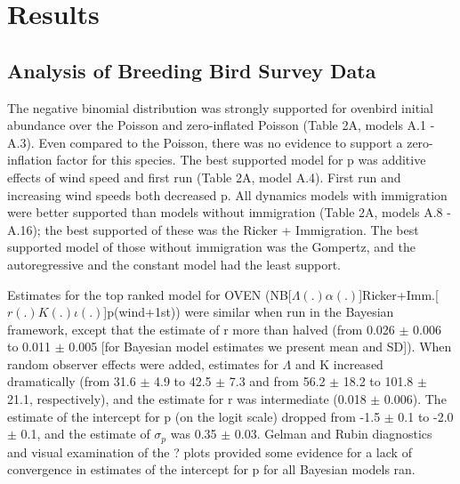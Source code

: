 \documentclass[12pt]{article}
\begin{document}
\section{Results}

\subsection{Analysis of Breeding Bird Survey Data}


The negative binomial distribution was strongly supported for ovenbird
initial abundance over the Poisson and zero-inflated Poisson (Table
2A, models A.1 - A.3).  Even compared to the Poisson, there was no
evidence to support a zero-inflation factor for this species.  The
best supported model for p was additive effects of wind speed and
first run (Table 2A, model A.4).  First run and increasing wind speeds
both decreased p.  All dynamics models with immigration were better
supported than models without immigration (Table 2A, models A.8 -
A.16); the best supported of these was the Ricker + Immigration.  The
best supported model of those without immigration was the Gompertz,
and the autoregressive and the constant model had the least support.

Estimates for the top ranked model for OVEN
(NB[$\Lambda (.) \alpha (.)$]Ricker+Imm.[$r(.)K(.) \iota (.)$]p(wind+1st)) were similar when
run in the Bayesian framework, except that the estimate of r more than
halved (from 0.026 $\pm$ 0.006 to 0.011 $\pm$ 0.005 [for Bayesian model
estimates we present mean and SD]).  When random observer effects were
added, estimates for $\Lambda$ and K increased dramatically (from 31.6 $\pm$ 4.9
to 42.5 $\pm$ 7.3 and from 56.2 $\pm$ 18.2 to 101.8 $\pm$ 21.1, respectively), and
the estimate for r was intermediate (0.018 $\pm$ 0.006).  The estimate of
the intercept for p (on the logit scale) dropped from -1.5 $\pm$ 0.1 to
-2.0 $\pm$ 0.1, and the estimate of $\sigma_p$ was 0.35 $\pm$ 0.03.
Gelman and Rubin diagnostics and visual examination of the ? plots
provided some evidence for a lack of convergence in estimates of the
intercept for p for all Bayesian models ran.
\end{document}
